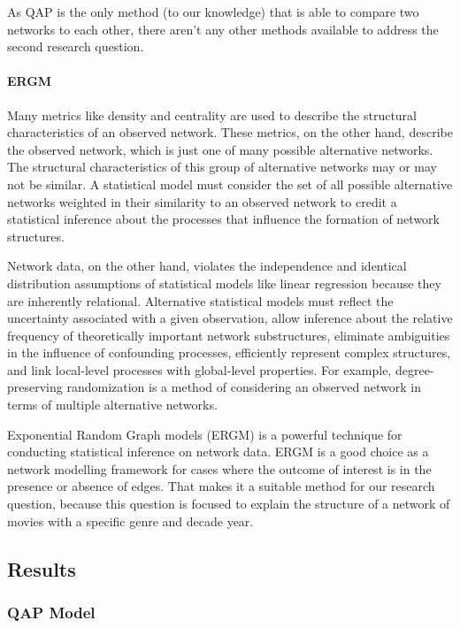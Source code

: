 \documentclass[
  english,
  man,floatsintext]{apa6}
\let\oldparagraph\paragraph
\renewcommand{\paragraph}[1]{\oldparagraph{#1}\mbox{}}
\begin{document}
As QAP is the only method (to our knowledge) that is able to compare two networks to each other, there aren't any other methods available to address the second research question.

\hypertarget{ergm}{%
\paragraph{ERGM}\label{ergm}}

Many metrics like density and centrality are used to describe the structural characteristics of an observed network. These metrics, on the other hand, describe the observed network, which is just one of many possible alternative networks. The structural characteristics of this group of alternative networks may or may not be similar. A statistical model must consider the set of all possible alternative networks weighted in their similarity to an observed network to credit a statistical inference about the processes that influence the formation of network structures.

Network data, on the other hand, violates the independence and identical distribution assumptions of statistical models like linear regression because they are inherently relational. Alternative statistical models must reflect the uncertainty associated with a given observation, allow inference about the relative frequency of theoretically important network substructures, eliminate ambiguities in the influence of confounding processes, efficiently represent complex structures, and link local-level processes with global-level properties. For example, degree-preserving randomization is a method of considering an observed network in terms of multiple alternative networks.

Exponential Random Graph models (ERGM) is a powerful technique for conducting statistical inference on network data. ERGM is a good choice as a network modelling framework for cases where the outcome of interest is in the presence or absence of edges. That makes it a suitable method for our research question, because this question is focused to explain the structure of a network of movies with a specific genre and decade year.

\hypertarget{results}{%
\subsection{Results}\label{results}}

\hypertarget{qap-model}{%
\subsubsection{QAP Model}\label{qap-model}}
\end{document}
